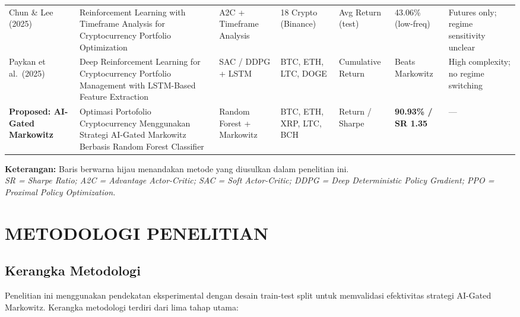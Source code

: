 \documentclass[12pt,a4paper]{article}
\begin{document}
\begin{table}[h]
\begin{tabular}{
  L{2.5cm}
  L{4.5cm}
  L{2.5cm}
  L{2.2cm}
  C{2.0cm}
  C{2.0cm}
  L{3.5cm}
}
Chun \& Lee (2025) &
Reinforcement Learning with Timeframe Analysis for Cryptocurrency Portfolio Optimization &
A2C + Timeframe Analysis &
18 Crypto (Binance) &
Avg Return (test) &
43.06\% (low-freq) &
Futures only; regime sensitivity unclear \\[4pt]

Paykan et al.\ (2025) &
Deep Reinforcement Learning for Cryptocurrency Portfolio Management with LSTM-Based Feature Extraction &
SAC / DDPG + LSTM &
BTC, ETH, LTC, DOGE &
Cumulative Return &
Beats Markowitz &
High complexity; no regime switching \\[4pt]

\textbf{Proposed: AI-Gated Markowitz} &
Optimasi Portofolio Cryptocurrency Menggunakan Strategi AI-Gated Markowitz Berbasis Random Forest Classifier &
Random Forest + Markowitz &
BTC, ETH, XRP, LTC, BCH &
Return / Sharpe &
\textbf{90.93\% / SR 1.35} &
--- \\

\bottomrule
\end{tabular}

\vspace{8pt}
\begin{flushleft}
\footnotesize
\textbf{Keterangan:} Baris berwarna hijau menandakan metode yang diusulkan dalam penelitian ini. \\[2pt]
\textit{SR = Sharpe Ratio; A2C = Advantage Actor-Critic; SAC = Soft Actor-Critic; DDPG = Deep Deterministic Policy Gradient; PPO = Proximal Policy Optimization.}
\end{flushleft}

\end{table}

\newpage

\section{METODOLOGI PENELITIAN}

\subsection{Kerangka Metodologi}

Penelitian ini menggunakan pendekatan eksperimental dengan desain train-test split untuk memvalidasi efektivitas strategi AI-Gated Markowitz. Kerangka metodologi terdiri dari lima tahap utama:
\end{document}
